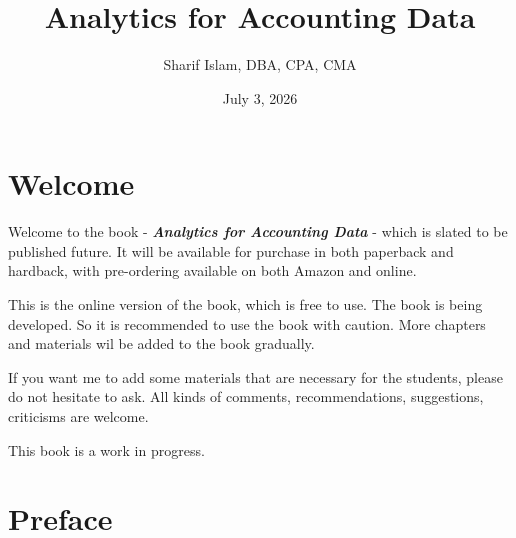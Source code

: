 \documentclass[
  letterpaper,
  DIV=11,
  numbers=noendperiod]{scrreprt}
\title{Analytics for Accounting Data}
\author{Sharif Islam, DBA, CPA, CMA}
\date{July 3, 2026}
\renewcommand*\contentsname{Table of contents}
\newcommand\contentsname{Table of contents}
\begin{document}
\maketitle

\renewcommand*\contentsname{Table of contents}
{
\setcounter{tocdepth}{2}
\tableofcontents
}


\chapter*{Welcome}\label{welcome}


Welcome to the book - \emph{\textbf{Analytics for Accounting Data}} -
which is slated to be published future. It will be available for
purchase in both paperback and hardback, with pre-ordering available on
both Amazon and online.

This is the online version of the book, which is free to use. The book
is being developed. So it is recommended to use the book with caution.
More chapters and materials wil be added to the book gradually.

If you want me to add some materials that are necessary for the
students, please do not hesitate to ask. All kinds of comments,
recommendations, suggestions, criticisms are welcome.

\begin{tcolorbox}[enhanced jigsaw, arc=.35mm, bottomrule=.15mm, bottomtitle=1mm, breakable, colback=white, colbacktitle=quarto-callout-warning-color!10!white, colframe=quarto-callout-warning-color-frame, coltitle=black, left=2mm, leftrule=.75mm, opacityback=0, opacitybacktitle=0.6, rightrule=.15mm, title=\textcolor{quarto-callout-warning-color}{\faExclamationTriangle}\hspace{0.5em}{Warning}, titlerule=0mm, toprule=.15mm, toptitle=1mm]

This book is a work in progress.

\end{tcolorbox}


\chapter*{Preface}\label{preface}

\end{document}
